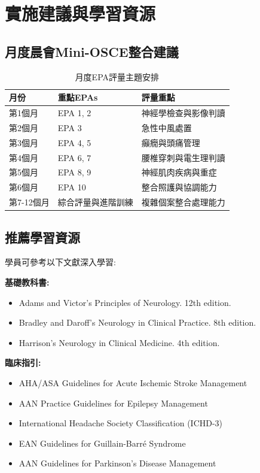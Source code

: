 \documentclass[12pt,a4paper]{article}
\begin{document}
\section{實施建議與學習資源}

\subsection{月度晨會Mini-OSCE整合建議}
\begin{table}[h]
    \centering
    \caption{月度EPA評量主題安排}
    \begin{tabular}{p{2.5cm} p{4.5cm} p{7cm}}
        \toprule
        \textbf{月份} & \textbf{重點EPAs} & \textbf{評量重點} \\
        \midrule
        第1個月 & EPA 1, 2 & 神經學檢查與影像判讀 \\
        第2個月 & EPA 3 & 急性中風處置 \\
        第3個月 & EPA 4, 5 & 癲癇與頭痛管理 \\
        第4個月 & EPA 6, 7 & 腰椎穿刺與電生理判讀 \\
        第5個月 & EPA 8, 9 & 神經肌肉疾病與重症 \\
        第6個月 & EPA 10 & 整合照護與協調能力 \\
        第7-12個月 & 綜合評量與進階訓練 & 複雜個案整合處理能力 \\
        \bottomrule
    \end{tabular}
\end{table}

\subsection{推薦學習資源}
學員可參考以下文獻深入學習:

\textbf{基礎教科書:}
\begin{itemize}
    \item Adams and Victor's Principles of Neurology. 12th edition.
    \item Bradley and Daroff's Neurology in Clinical Practice. 8th edition.
    \item Harrison's Neurology in Clinical Medicine. 4th edition.
\end{itemize}

\textbf{臨床指引:}
\begin{itemize}
    \item AHA/ASA Guidelines for Acute Ischemic Stroke Management
    \item AAN Practice Guidelines for Epilepsy Management
    \item International Headache Society Classification (ICHD-3)
    \item EAN Guidelines for Guillain-Barré Syndrome
    \item AAN Guidelines for Parkinson's Disease Management
\end{itemize}
\end{document}

